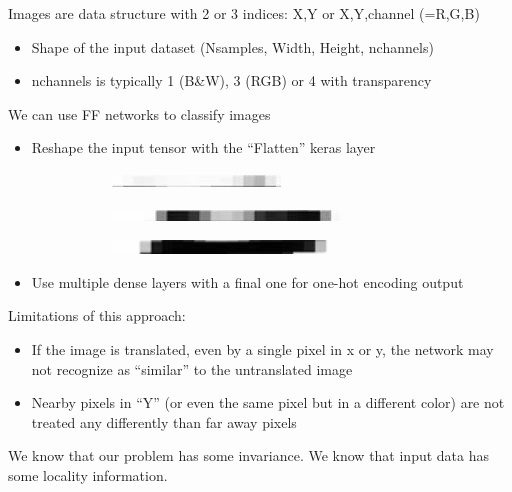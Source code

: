 Images are data structure with 2 or 3 indices: X,Y or X,Y,channel (=R,G,B)
\begin{itemize}
	\item Shape of the input dataset (Nsamples, Width, Height, nchannels)
	\item nchannels is typically 1 (B\&W), 3 (RGB) or 4 with transparency
\end{itemize}
We can use FF networks to classify images
\begin{itemize}
	\item Reshape the input tensor with the “Flatten” keras layer
\begin{figure}[ht]
	\centering
	\begin{subfigure}{.3\textwidth}
		\centering
		\includegraphics[width=0.9\linewidth]{figure_ml/classif1.png}
	\end{subfigure}%
	\begin{subfigure}{.3\textwidth}
		\centering
		\includegraphics[width=0.9\linewidth]{figure_ml/classif2.png}
	\end{subfigure}%
	\begin{subfigure}{.3\textwidth}
		\centering
		\includegraphics[width=0.9\linewidth]{figure_ml/classif3.png}
	\end{subfigure}
\end{figure}

	
	\item Use multiple dense layers with a final one for one-hot encoding output
\end{itemize}
Limitations of this approach:
\begin{itemize}
	\item If the image is translated, even by a single pixel in x or y, the network may not recognize as “similar” to the untranslated image
	\item Nearby pixels in “Y” (or even the same pixel but in a different color) are not treated any differently than far away pixels
\end{itemize}
We know that our problem has some invariance. We know that input data has some locality information.

